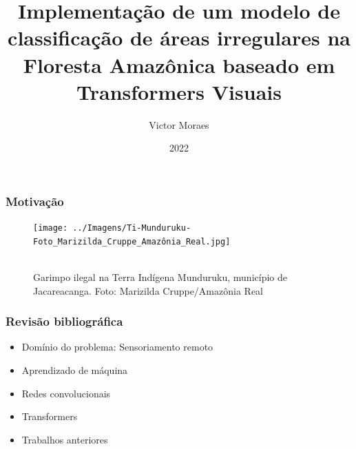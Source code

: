 \documentclass{beamer}
\title{Implementação de um modelo de classificação de áreas irregulares na Floresta Amazônica baseado em Transformers Visuais}
\author{Victor Moraes}
\institute{UFMG}
\date{2022}
\begin{document}
\frame{\titlepage}

\begin{frame}
\frametitle{Motivação}  

    \begin{figure}[!h]
    \centering
    \texttt{[image: ../Imagens/Ti-Munduruku-Foto\_Marizilda\_Cruppe\_Amazônia\_Real.jpg]}
    \caption[width=0.2\columnwidth]{\\\small Garimpo ilegal na Terra Indígena Munduruku, município de Jacareacanga. Foto: Marizilda Cruppe/Amazônia Real}
    \label{fig:garimpo}
    \end{figure}


\end{frame}


\begin{frame}
    \frametitle{Revisão bibliográfica }
\begin{itemize}
    \item Domínio do problema: Sensoriamento remoto
    \item Aprendizado de máquina
    \item Redes convolucionais
    \item Transformers
    \item Trabalhos anteriores
\end{itemize}

\end{frame}
\end{document}
